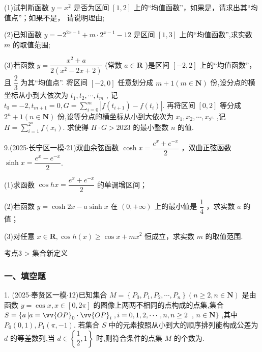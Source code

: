(1)试判断函数 $y = {x}^{2}$ 是否为区间 $\left\lbrack  {1,2}\right\rbrack$ 上的“均值函数”，如果是，请求出其“均值点”；如果不是， 请说明理由;

(2)已知函数 $y =  - {2}^{{2x} - 1} + m \cdot  {2}^{x - 1} - {12}$ 是区间 $\left\lbrack  {1,3}\right\rbrack$ 上的“均值函数”,求实数 $m$ 的取值范围;

(3)若函数 $y = \dfrac{{x}^{2} + a}{2\left( {{x}^{2} - {2x} + 2}\right) }$ (常数 $a \in  \mathbf{R}$ )是区间 $\left\lbrack  {-2,2}\right\rbrack$ 上的“均值函数”，且 $\dfrac{2}{3}$ 为其“均值点”. 将区间 $\left\lbrack  {-2,0}\right\rbrack$ 任意划分成 $m + 1\left( {m \in  \mathbf{N}}\right)$ 份,设分点的横坐标从小到大依次为 ${t}_{1},{t}_{2},\cdots ,{t}_{m}$ , 记 ${t}_{0} =  - 2,{t}_{m + 1} = 0,G = \mathop{\sum }\limits_{{i = 0}}^{m}\left| {f\left( {t}_{i + 1}\right)  - f\left( {t}_{i}\right) }\right|$. 再将区间 $\left\lbrack  {0,2}\right\rbrack$ 等分成 ${2}^{n} + 1\left( {n \in  \mathbf{N}}\right)$ 份,设等分点的横坐标从小到大依次为 ${x}_{1},{x}_{2},\cdots ,{x}_{{2}^{n}}$ ,记 $H = \mathop{\sum }\limits_{{i = 1}}^{{2}^{n}}f\left( {x}_{i}\right)$. 求使得 $H \cdot  G > {2023}$ 的最小整数 $n$ 的值.

9.(2025$\cdot$长宁区一模$\cdot$21)双曲余弦函数 $\cosh x = \dfrac{{{e}}^{x} + {{e}}^{-x}}{2}$ ，双曲正弦函数 $\sinh x = \dfrac{{{e}}^{x} - {{e}}^{-x}}{2}$.

(1)求函数 $\cos {hx} = \dfrac{{{e}}^{x} + {{e}}^{-x}}{2}$ 的单调增区间；

(2)若函数 $y = \cosh {2x} - a\sinh x$ 在 $\left( {0, + \infty }\right)$ 上的最小值是 $\dfrac{1}{4}$ ，求实数 $a$ 的值；

(3)对任意 $x \in  \mathbf{R},\cos h\left( x\right)  \geq  \cos x + m{x}^{2}$ 恒成立，求实数 $m$ 的取值范围.

考点3 > 集合新定义

\subsubsection*{一、填空题}

1. (2025$\cdot$奉贤区一模$\cdot$12)已知集合 $M = \left\{  {{P}_{0},{P}_{1},{P}_{2},\cdots ,{P}_{n}}\right\}  \left( {n \geq  2,n \in  \mathbf{N}}\right)$ 是由函数 $y = \cos x,x \in  \left\lbrack  {0,{2\pi }}\right\rbrack$ 的图像上两两不相同的点构成的点集,集合 $S = \left\{  {a\left| {a = {\vv{OP}}_{0} \cdot  {\vv{OP}}_{i}}\right. ,i = 0,1,2,\cdots ,n,n \geq  2}\right.$ , $n \in  \mathbf{N}\}$ ,其中 ${P}_{0}\left( {0,1}\right) ,{P}_{1}\left( {\pi , - 1}\right)$. 若集合 $S$ 中的元素按照从小到大的顺序排列能构成公差为 $d$ 的等差数列,当 $d \in  \left\{  {\dfrac{1}{2},1}\right\}$ 时,则符合条件的点集 $M$ 的个数为\blkda[2]{}.

